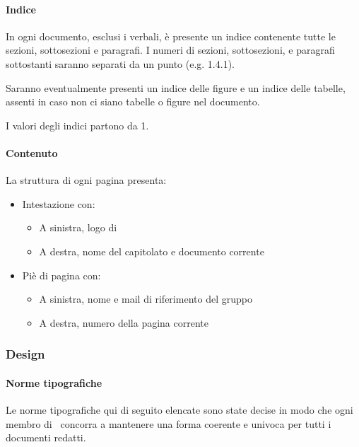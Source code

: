 			\paragraph{Indice}\label{PS:Documentazione:Struttura:Indice}
			In ogni documento, esclusi i verbali, è presente un indice contenente tutte le sezioni, sottosezioni e paragrafi. I numeri di sezioni, sottosezioni,
			e paragrafi sottostanti saranno separati da un punto (e.g. 1.4.1).\par
			Saranno eventualmente presenti un indice delle
			figure e un indice delle tabelle, assenti in caso non ci siano tabelle o figure nel documento.\par
			I valori degli indici partono da 1.

			\paragraph{Contenuto}\label{PS:Documentazione:Struttura:Contenuto}
			La struttura di ogni pagina presenta:
			\begin{itemize}
				\item Intestazione con:
				\begin{itemize}
					\item A sinistra, logo di \gruppo
					\item A destra, nome del capitolato e documento corrente
				\end{itemize}
				\item Piè di pagina con:
				\begin{itemize}
					\item A sinistra, nome e mail di riferimento del gruppo
					\item A destra, numero della pagina corrente
				\end{itemize}
			\end{itemize}


		\subsubsection{Design}\label{PS:Documentazione:Design}

			\paragraph{Norme tipografiche}\label{PS:Documentazione:Design:NormeT}
			Le norme tipografiche qui di seguito elencate sono state decise in modo che ogni membro di \gruppo\ concorra a mantenere una forma coerente e univoca
			per tutti i documenti redatti.

